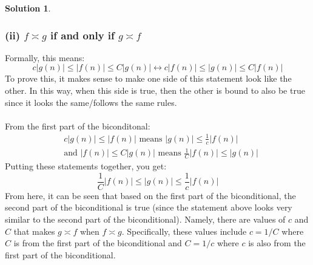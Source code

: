 \documentclass{article}
\theoremstyle{definition}
\newtheorem*{solution}{Solution}
\begin{document}
\begin{solution}
\subsubsection*{(ii) $f \asymp g$ if and only if $g \asymp f$}
Formally, this means:
$$ c|g(n)| \leqslant |f(n)| \leqslant C|g(n)| \longleftrightarrow c|f(n)| \leqslant |g(n)| \leqslant C|f(n)|$$
To prove this, it makes sense to make one side of this statement look like the other. In this way, when this side is true, then the other is bound to also be true since it looks the same/follows the same rules.\\\\
From the first part of the biconditonal:
\begin{align*}
&c|g(n)| \leqslant |f(n)| \mbox{ means } |g(n)| \leqslant \frac{1}{c} |f(n)| \\
&\mbox{and } |f(n)| \leqslant C|g(n)| \mbox{ means } \frac{1}{C} |f(n)| \leqslant |g(n)|
\end{align*}
Putting these statements together, you get:
$$ \frac{1}{C} |f(n)| \leqslant |g(n)| \leqslant \frac{1}{c} |f(n)|$$
From here, it can be seen that based on the first part of the biconditional, the second part of the biconditional is true (since the statement above looks very similar to the second part of the biconditional). Namely, there are values of $c$ and $C$ that makes $g \asymp f$ when $f \asymp g$. Specifically, these values include $c = 1/C$ where $C$ is from the first part of the biconditional and $C = 1/c$ where $c$ is also from the first part of the biconditional.

\end{solution}
\end{document}
